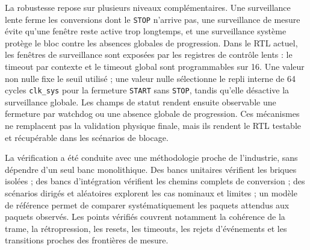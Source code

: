 La robustesse repose sur plusieurs niveaux complémentaires. Une surveillance lente ferme les conversions dont le \texttt{STOP} n'arrive pas, une surveillance de mesure évite qu'une fenêtre reste active trop longtemps, et une surveillance système protège le bloc contre les absences globales de progression. Dans le RTL actuel, les fenêtres de surveillance sont exposées par les registres de contrôle lents : le timeout par contexte et le timeout global sont programmables sur \SI{16}{\bit}. Une valeur non nulle fixe le seuil utilisé ; une valeur nulle sélectionne le repli interne de \num{64} cycles \texttt{clk\_sys} pour la fermeture \texttt{START} sans \texttt{STOP}, tandis qu'elle désactive la surveillance globale. Les champs de statut rendent ensuite observable une fermeture par watchdog ou une absence globale de progression. Ces mécanismes ne remplacent pas la validation physique finale, mais ils rendent le RTL testable et récupérable dans les scénarios de blocage.

La vérification a été conduite avec une méthodologie proche de l'industrie, sans dépendre d'un seul banc monolithique. Des bancs unitaires vérifient les briques isolées ; des bancs d'intégration vérifient les chemins complets de conversion ; des scénarios dirigés et aléatoires explorent les cas nominaux et limites ; un modèle de référence permet de comparer systématiquement les paquets attendus aux paquets observés. Les points vérifiés couvrent notamment la cohérence de la trame, la rétropression, les resets, les timeouts, les rejets d'événements et les transitions proches des frontières de mesure.

